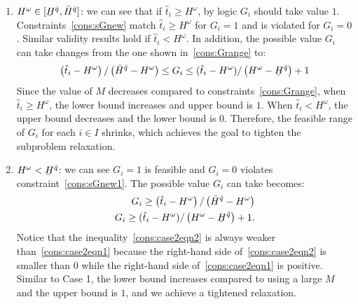 \documentclass[11pt]{article}
\renewcommand{\underbar}{\underaccent{\bar}}
\begin{document}
	\begin{enumerate}
		\item 
			\(H^\omega \in
			 [\underbar{H}^{\hat{q}},\bar{H}^{\hat{q}}]\): 
			 we can see that if \(\hat{t}_i \geq H^\omega\), by logic \(G_i\) should take value \(1\). Constraints~\eqref{cons:sGnew} match \(\hat{t}_i \geq H^\omega\) for \(G_i = 1\) and is violated for \(G_i = 0\). Similar validity results hold if \(\hat{t}_i < H^\omega\). In addition, the possible value \(G_i\) can take changes from the one shown in~\eqref{cons:Grange} to:
			\begin{equation}
			\left(\hat{t}_i - H^\omega \right)/\left( \bar{H}^{\hat{q}} - H^\omega \right) \leq G_i \leq (\hat{t}_i - H^\omega)/\left(H^\omega - \underbar{H}^{\hat{q}} \right) + 1 \label{cons:case1}
			\end{equation}
			Since the value of \(M\) decreases compared to constraints~\eqref{cons:Grange}, when \(\hat{t}_i \geq H^\omega\), the lower bound increases and upper bound is \(1\). When \(\hat{t}_i < H^\omega\), the upper bound decreases and the lower bound is \(0\). Therefore, the feasible range of \(G_i\) for each \(i \in I\) shrinks, which achieves the goal to tighten the subproblem relaxation.
		\item 
			\(H^\omega < \underbar{H}^{\hat{q}}\): 
			we can see \(G_i = 1\) is feasible and \(G_i = 0\) violates constraint~\eqref{cons:sGnew1}. The possible value \(G_i\) can take becomes:
			\begin{subequations}
				\begin{align}
				G_i \geq \left(\hat{t}_i - H^\omega \right)/\left( \bar{H}^{\hat{q}} - H^\omega \right) \label{cons:case2eqn1}\\
				G_i \geq (\hat{t}_i - H^\omega)/\left(H^\omega - \underbar{H}^{\hat{q}} \right) + 1. \label{cons:case2eqn2}
				\end{align}
			\end{subequations}
			Notice that the inequality~\eqref{cons:case2eqn2} is always weaker than~\eqref{cons:case2eqn1} because the right-hand side of~\eqref{cons:case2eqn2} is smaller than 0 while the right-hand side of~\eqref{cons:case2eqn1} is positive. Similar to Case 1, the lower bound increases compared to using a large \(M\) and the upper bound is \(1\), and we achieve a tightened relaxation.

\end{enumerate}
\end{document}
